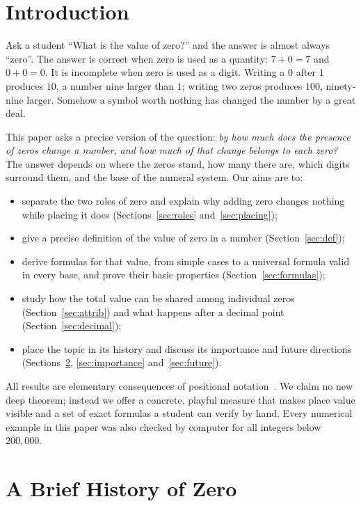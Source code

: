 \documentclass[11pt,a4paper]{article}
\theoremstyle{definition}
\begin{document}
\section{Introduction}

Ask a student ``What is the value of zero?'' and the answer is almost always ``zero''. The answer is correct when zero is used as a quantity: $7+0=7$ and $0+0=0$. It is incomplete when zero is used as a digit. Writing a $0$ after $1$ produces $10$, a number nine larger than $1$; writing two zeros produces $100$, ninety-nine larger. Somehow a symbol worth nothing has changed the number by a great deal.

This paper asks a precise version of the question: \emph{by how much does the presence of zeros change a number, and how much of that change belongs to each zero?} The answer depends on where the zeros stand, how many there are, which digits surround them, and the base of the numeral system. Our aims are to:
\begin{itemize}[nosep]
  \item separate the two roles of zero and explain why adding zero changes nothing while placing it does (Sections~\ref{sec:roles} and~\ref{sec:placing});
  \item give a precise definition of the value of zero in a number (Section~\ref{sec:def});
  \item derive formulas for that value, from simple cases to a universal formula valid in every base, and prove their basic properties (Section~\ref{sec:formulas});
  \item study how the total value can be shared among individual zeros (Section~\ref{sec:attrib}) and what happens after a decimal point (Section~\ref{sec:decimal});
  \item place the topic in its history and discuss its importance and future directions (Sections~\ref{sec:history}, \ref{sec:importance} and~\ref{sec:future}).
\end{itemize}

All results are elementary consequences of positional notation~\cite{ifrah,knuth}. We claim no new deep theorem; instead we offer a concrete, playful measure that makes place value visible and a set of exact formulas a student can verify by hand. Every numerical example in this paper was also checked by computer for all integers below $200{,}000$.

\section{A Brief History of Zero}\label{sec:history}
\end{document}
